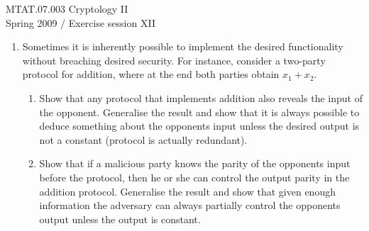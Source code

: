 \documentclass{article}
\begin{document}
\noindent	
MTAT.07.003 Cryptology II\\
Spring 2009 / Exercise session XII



\begin{enumerate}

\item Sometimes it is inherently possible to implement the desired
  functionality without breaching desired security. For instance,
  consider a two-party protocol for addition, where at the end both
  parties obtain $x_1+x_2$.
  \begin{enumerate}
  \item Show that any protocol that implements addition also reveals
    the input of the opponent. Generalise the result and show that it
    is always possible to deduce something about the opponents input
    unless the desired output is not a constant (protocol is actually
    redundant).
  \item Show that if a malicious party knows the parity of the
    opponents input before the protocol, then he or she can control
    the output parity in the addition protocol. Generalise the result
    and show that given enough information the adversary can always
    partially control the opponents output unless the output is
    constant.
  \end{enumerate}


\end{enumerate}
\end{document}
